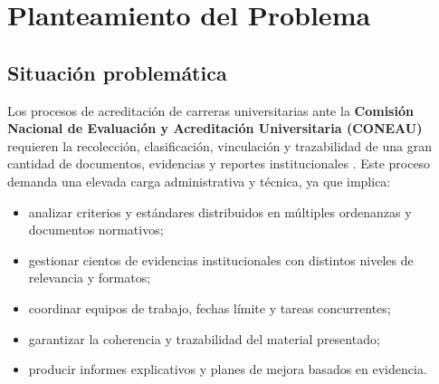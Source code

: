 \documentclass[12pt]{article}
\let\cite\citep
\begin{document}










\section{Planteamiento del Problema}

\subsection{Situación problemática}

Los procesos de acreditación de carreras universitarias ante la \textbf{Comisión Nacional de Evaluación y Acreditación Universitaria (CONEAU)} requieren la recolección, clasificación, vinculación y trazabilidad de una gran cantidad de documentos, evidencias y reportes institucionales \cite{ordenanza62,ordenanza75}. 
Este proceso demanda una elevada carga administrativa y técnica, ya que implica:

\begin{itemize}
    \item analizar criterios y estándares distribuidos en múltiples ordenanzas y documentos normativos;
    \item gestionar cientos de evidencias institucionales con distintos niveles de relevancia y formatos;
    \item coordinar equipos de trabajo, fechas límite y tareas concurrentes;
    \item garantizar la coherencia y trazabilidad del material presentado;
    \item producir informes explicativos y planes de mejora basados en evidencia.
\end{itemize}
\end{document}
